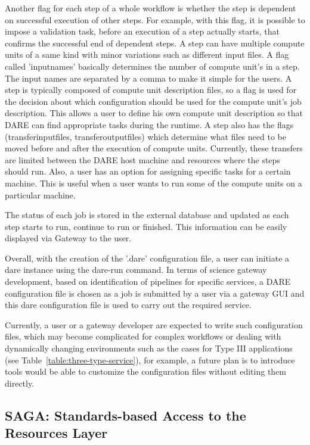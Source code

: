 \documentclass[]{svjour3}
\begin{document}
Another flag for each step of a whole workflow is whether the step is dependent
on successful execution of other steps. For example, with this flag, it is
possible to impose a validation task, before an execution of a step actually
starts, that confirms the successful end of dependent steps. A step can have
multiple compute units of a same kind with minor variations such as different
input files. A flag called 'input\textunderscore names' basically determines the
number of compute unit's in a step. The input names are separated by a comma to
make it simple for the users. A step is typically composed of compute unit
description files, so a flag is used for the decision about which configuration
should be used for the compute unit's job description. This allows a user to
define his own compute unit description so that DARE can find appropriate tasks
during the runtime. A step also has the flags (transfer\textunderscore input\textunderscore files,
transfer\textunderscore output\textunderscore files) which determine what files
need to be moved before and after the execution of compute units. Currently,
these transfers are limited between the DARE host machine and resources where
the steps should run. Also, a user has an option for assigning specific tasks
for a certain machine. This is useful when a user wants to run some of the 
compute units on a particular machine. 

The status of each job is stored in the external database and updated as each
step starts to run, continue to run or finished. This information can be easily
displayed via Gateway to the user.

Overall, with the creation of the '.dare' configuration file, a user can initiate
a dare instance using the dare-run command. In terms of science gateway development,
based on identification of pipelines for specific services, a DARE configuration
file is chosen as a job is submitted by a user via a gateway GUI and this dare configuration
file is used to carry out the required service.

Currently, a user or a gateway developer are expected to write such configuration
files, which may become complicated for complex workflows or dealing with
dynamically changing environments such as the cases for Type III applications
(see Table~\ref{table:three-type-service}), for example, a future plan is to
introduce tools would be able to customize the configuration files without
editing them directly.

\subsection{SAGA: Standards-based Access to the Resources Layer}
\end{document}
